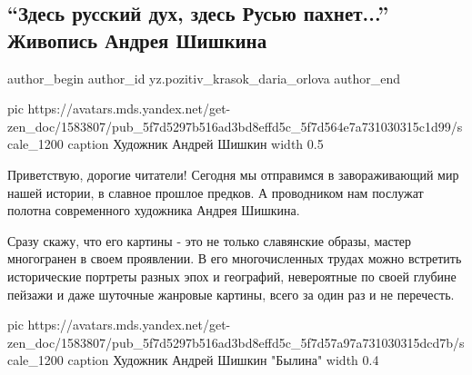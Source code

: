  
 
 
 
 
 
\subsection{\enquote{Здесь русский дух, здесь Русью пахнет...} Живопись Андрея Шишкина}
\label{sec:07_10_2020.sites.ru.zen_yandex.yz.pozitiv_krasok_daria_orlova.1.russkii_duh_zhivopis_andrei_shishkin}
\ifcmt
	author_begin
   author_id yz.pozitiv_krasok_daria_orlova
	author_end
\fi

\ifcmt
  pic https://avatars.mds.yandex.net/get-zen_doc/1583807/pub_5f7d5297b516ad3bd8effd5c_5f7d564e7a731030315c1d99/scale_1200
	caption Художник Андрей Шишкин
	width 0.5
\fi


Приветствую, дорогие читатели! Сегодня мы отправимся в завораживающий мир нашей
истории, в славное прошлое предков. А проводником нам послужат полотна
современного художника Андрея Шишкина.

Сразу скажу, что его картины - это не только славянские образы, мастер
многогранен в своем проявлении. В его многочисленных трудах можно встретить
исторические портреты разных эпох и географий, невероятные по своей глубине
пейзажи и даже шуточные жанровые картины, всего за один раз и не перечесть.

\ifcmt
  pic https://avatars.mds.yandex.net/get-zen_doc/1583807/pub_5f7d5297b516ad3bd8effd5c_5f7d57a97a731030315dcd7b/scale_1200
	caption Художник Андрей Шишкин "Былина"
	width 0.4
\fi

